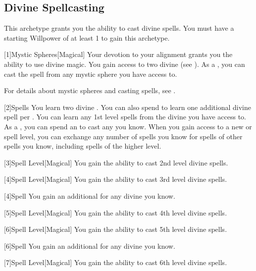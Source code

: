     \subsection{Divine Spellcasting}
        This archetype grants you the ability to cast divine spells.
        You must have a starting Willpower of at least 1 to gain this archetype.

        [1]{Mystic Spheres}[Magical]
        Your devotion to your alignment grants you the ability to use divine magic.
        You gain access to two divine  (see ).
        As a , you can cast the  spell from any mystic sphere you have access to.

        For details about mystic spheres and casting spells, see .

        [2]{Spells} You learn two divine .
        You can also spend  to learn one additional divine spell per .
        You can learn any 1st level spells from the divine  you have access to.
        As a , you can spend an  to cast any  you know.
        When you gain access to a new  or spell level, you can exchange any number of spells you know for spells of other spells you know, including spells of the higher level.

        [3]{Spell Level}[Magical] You gain the ability to cast 2nd level divine spells.

        [4]{Spell Level}[Magical] You gain the ability to cast 3rd level divine spells.

        [4]{Spell} You gain an additional  for any divine  you know.

        [5]{Spell Level}[Magical] You gain the ability to cast 4th level divine spells.

        [6]{Spell Level}[Magical] You gain the ability to cast 5th level divine spells.

        [6]{Spell} You gain an additional  for any divine  you know.

        [7]{Spell Level}[Magical] You gain the ability to cast 6th level divine spells.

